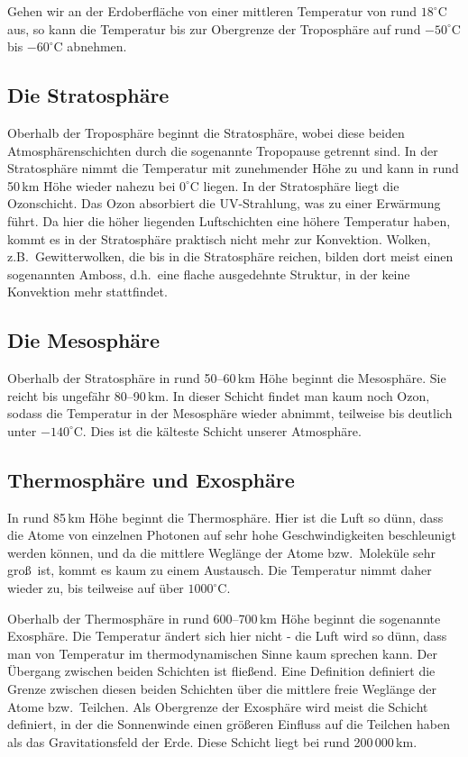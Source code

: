 Gehen wir an der Erdoberfl\"ache von einer mittleren Temperatur von rund $18^\circ$C aus,
so kann die Temperatur bis zur Obergrenze der Troposph\"are auf rund $-50^\circ$C bis $-60^\circ$C
abnehmen.

\subsection{Die Stratosph\"are}

Oberhalb der Troposph\"are beginnt die Stratosph\"are, wobei diese beiden Atmosph\"arenschichten
durch die sogenannte Tropopause getrennt sind. In der Stratosph\"are nimmt die Temperatur
mit zunehmender H\"ohe zu und kann in rund 50\,km H\"ohe wieder nahezu bei $0^\circ$C
liegen. In der Stratosph\"are liegt die Ozonschicht. Das Ozon absorbiert die UV-Strahlung,
was zu einer Erw\"armung f\"uhrt. Da hier die h\"oher liegenden Luftschichten eine h\"ohere
Temperatur haben, kommt es in der Stratosph\"are praktisch nicht mehr zur Konvektion. 
Wolken, z.B.\ Gewitterwolken, die bis in die Stratosph\"are reichen, bilden dort meist einen
sogenannten Amboss, d.h.\ eine flache ausgedehnte Struktur, in der keine Konvektion mehr
stattfindet. 

\subsection{Die Mesosph\"are}

Oberhalb der Stratosph\"are in rund 50--60\,km H\"ohe beginnt die Mesosph\"are. Sie reicht bis 
ungef\"ahr 80--90\,km. In dieser Schicht findet man kaum noch Ozon, sodass die Temperatur 
in der Mesosph\"are wieder abnimmt, teilweise bis deutlich unter $-140^\circ$C. Dies ist 
die k\"alteste Schicht unserer Atmosph\"are.

\subsection{Thermosph\"are und Exosph\"are}

In rund 85\,km H\"ohe beginnt die Thermosph\"are. Hier ist die Luft so d\"unn, dass
die Atome von einzelnen Photonen auf sehr hohe Geschwindigkeiten beschleunigt
werden k\"onnen, und da die mittlere Wegl\"ange der Atome bzw.\ Molek\"ule sehr
gro\ss\ ist, kommt es kaum zu einem Austausch. Die Temperatur nimmt daher wieder
zu, bis teilweise auf \"uber $1000^\circ$C. 

Oberhalb der Thermosph\"are in rund 600--700\,km H\"ohe beginnt die sogenannte
Exosph\"are. Die Temperatur \"andert sich hier nicht - die Luft wird so d\"unn, dass man
von Temperatur im thermodynamischen Sinne kaum sprechen kann. Der \"Ubergang
zwischen beiden Schichten ist flie\ss end. Eine Definition definiert die Grenze zwischen
diesen beiden Schichten \"uber die mittlere freie Wegl\"ange der Atome bzw.\ Teilchen.
Als Obergrenze der Exosph\"are wird meist die Schicht definiert, in der die Sonnenwinde
einen gr\"o\ss eren Einfluss auf die Teilchen haben als das Gravitationsfeld der Erde.
Diese Schicht liegt bei rund 200\,000\,km. 


